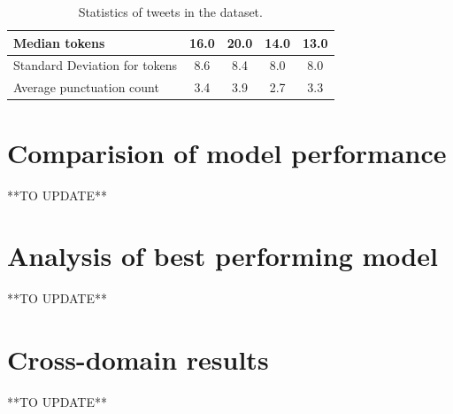 \begin{table}[htbp]
\begin{tabularx}{\textwidth}{|X|c|c|c|c|}
        \hline
        Median tokens                   & 16.0                & 20.0                & 14.0                    & 13.0            \\
        \hline
        Standard Deviation for tokens   & 8.6                 & 8.4                 & 8.0                     & 8.0             \\
        \hline
        \hline
        Average punctuation count       & 3.4                 & 3.9                 & 2.7                     & 3.3             \\
        \hline
    \end{tabularx}
    \caption{Statistics of tweets in the dataset.}
    \label{tab: tweets_statistics}
\end{table}



\section{Comparision of model performance}
**TO UPDATE**

\section{Analysis of best performing model}
**TO UPDATE**

\section{Cross-domain results}
**TO UPDATE**
